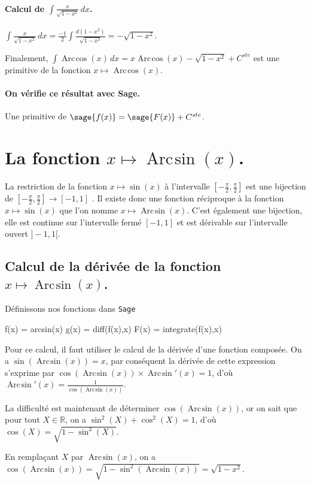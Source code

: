 \documentclass[a4paper,12pt]{report}
\def\eclaire{\mathbb}
\def\R{\ensuremath{\eclaire R}}
\renewcommand{\arcsin}{\mathop{\mathrm{Arc\mspace{2mu}sin}}}
\renewcommand{\arccos}{\mathop{\mathrm{Arc\mspace{2mu}cos}}}
\begin{document}
\paragraph{Calcul de $\int \frac{x}{\sqrt{1- x^2}} \, dx $.}
$\int \frac{x}{\sqrt{1- x^2}} \, dx = \frac{-1}{2} \int \frac{d(1-x^2)}{\sqrt{1- x^2}}= -\sqrt{1- x^2} $.

Finalement, $\int \arccos(x) \, dx = x  \arccos(x) - \sqrt{1- x^2} + C^{ste} $ est une primitive de la fonction $x \mapsto \arccos(x) $.
\paragraph{On vérifie ce résultat avec Sage.}
Une primitive de $\sage{f(x)} = \sage{F(x)} + C^{ste}$.


\section{La fonction  $x \mapsto \arcsin(x) $.}
La restriction de la fonction $x \mapsto \sin(x) $ à l'intervalle $\left[-\frac{\pi}{2},\frac{\pi}{2}\right]$ est une bijection de $\left[-\frac{\pi}{2},\frac{\pi}{2}\right] \rightarrow [-1,1]$ . Il existe donc une fonction réciproque à la fonction $x \mapsto \sin(x) $ que l'on nomme $x \mapsto \arcsin(x) $. C'est également une bijection, elle est continue sur l'intervalle fermé  $ [-1,1]$ et est dérivable sur l'intervalle ouvert $]-1,1[$.

\subsection{Calcul de la dérivée de la fonction $x \mapsto \arcsin(x) $.}
Définissons nos fonctions dans {\texttt{Sage}}
\begin{sageblock}
    f(x) = arcsin(x)
    g(x) = diff(f(x),x)
    F(x) = integrate(f(x),x)
\end{sageblock}

Pour ce calcul, il faut utiliser le calcul de la dérivée d'une fonction composée. On a $\sin(\arcsin(x))=x$, par conséquent la dérivée de cette expression s'exprime par $ \cos(\arcsin(x)) \times \arcsin\nolimits'(x) = 1$, d'où $\arcsin\nolimits'(x) = \frac{1}{\cos(\arcsin(x))} $.

La difficulté est maintenant de déterminer $\cos(\arcsin(x))$, or on sait que pour tout $X \in \R$, on a $\sin^2(X) + \cos^2(X) = 1$, d'où $\cos(X) = \sqrt{1-\sin^2(X)}$.

En remplaçant $X$ par $\arcsin(x)$, 
on a $\cos(\arcsin(x)) = \sqrt{1-\sin^2(\arcsin(x))} = \sqrt{1- x^2}$.
\end{document}
